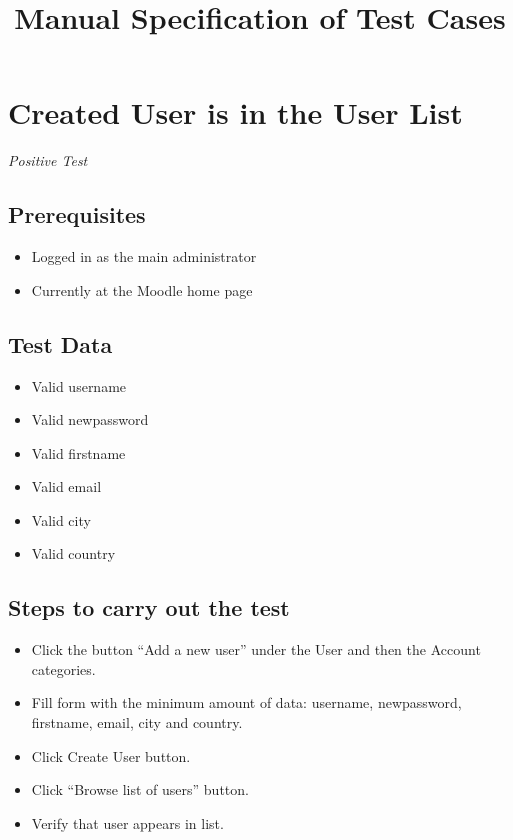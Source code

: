 \documentclass{article}
\title{Manual Specification of Test Cases}
\begin{document}
\maketitle


\section{Created User is in the User List}

\emph{Positive Test}

\subsection*{Prerequisites}

\begin{itemize}
  \item Logged in as the main administrator
  \item Currently at the Moodle home page
\end{itemize}

\subsection*{Test Data}

\begin{itemize}
  \item Valid username
  \item Valid newpassword
  \item Valid firstname
  \item Valid email
  \item Valid city
  \item Valid country
\end{itemize}

\subsection*{Steps to carry out the test}

\begin{itemize}
  \item Click the button ``Add a new user'' under the User and then
    the Account categories.
  \item Fill form with the minimum amount of data: username, newpassword,
    firstname, email, city and country.
  \item Click Create User button.
  \item Click ``Browse list of users'' button.
  \item Verify that user appears in list.
\end{itemize}
\end{document}
